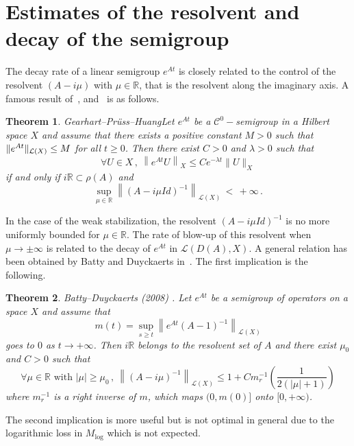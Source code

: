 \documentclass[10pt]{amsart}
\newtheorem{theo}{Theorem}[section]
\theoremstyle{definition}\newtheorem{defi}[theo]{Definition}\newtheorem{rema}[theo]{Remark}\newtheorem{exam}[theo]{Example}\newtheorem{exem}[theo]{Example}\newtheorem{nota}[theo]{Notation}
\newcommand{\RR}{\mathbb{R}}
\newcommand{\Cc}{\mathcal{C}}
\newcommand{\Lc}{\mathcal{L}}
\let\oldforall\forall
\renewcommand*{\forall}{\mathrel{\oldforall}}
\begin{document}
\section{Estimates of the resolvent and decay of the semigroup}

The decay rate of a linear semigroup $e^{At}$ is closely related to the control of the resolvent $(A-i\mu)$ with $\mu\in\RR$, that is the resolvent along the imaginary axis. A famous result of~\cite{Ge}, \cite{Pruss} and~\cite{Huang} is as follows.

\begin{theo}
\emph{Gearhart--Pr\"uss--Huang}\label{th-Huang}
Let $e^{At}$ be a $\Cc^0-$semigroup in a Hilbert space $X$ and assume that there exists a positive constant $M>0$ such that $\|e^{At}\|_{\Lc(X)}\linebreak\leq M$ for all $t\geq 0$. Then there exist $C>0$ and $\lambda >0$ such that
\[
\forall U\in X\,,\:\left\|e^{At}U\right\|_{X} \leq Ce^{-\lambda t} \|U\|_X
\]
if and only if $i\RR\subset \rho(A)$ and
\[
\sup_{\mu\in\RR} \left\|(A-i\mu Id)^{-1}\right\|_{\Lc(X)}\,<\,+\infty\,.
\]
\end{theo}

In the case of the weak stabilization, the resolvent $(A-i\mu Id)^{-1}$ is no more uniformly bounded for $\mu\in\RR$. The rate of blow-up of this resolvent when $\mu\rightarrow \pm\infty$ is related to the decay of $e^{At}$ in $\Lc(D(A),X)$. A general relation has been obtained by Batty and Duyckaerts in~\cite{Batty-Duyckaerts}. The first implication is the following.

\begin{theo}\label{th-BD-1}
\emph{Batty--Duyckaerts (2008) \cite[Proposition~1.3]{Batty-Duyckaerts}.}
Let $e^{At}$ be a semigroup of operators on a space $X$ and assume that
\[
m(t)=\sup_{s\geq t} \left\|e^{At}(A-1)^{-1}\right\|_{\Lc(X)}
\]
goes to $0$ as $t\rightarrow +\infty$. Then $i\RR$ belongs to the resolvent set of $A$ and there exist $\mu_0$ and $C>0$ such that
\[
\forall \mu\in \RR\text{ with }|\mu|\geq \mu_0\,,\:
\left\|(A-i\mu)^{-1}\right\|_{\Lc(X)}\leq 1 + C m^{-1}_r \left(\frac 1{2(|\mu|+1)}\right)
\]
where $m^{-1}_r$ is a right inverse of $m$, which maps $(0,m(0)]$ onto $[0,+\infty)$.
\end{theo}

The second implication is more useful but is not optimal in general due to the logarithmic loss in $M_{\log}$ which is not expected.
\end{document}
